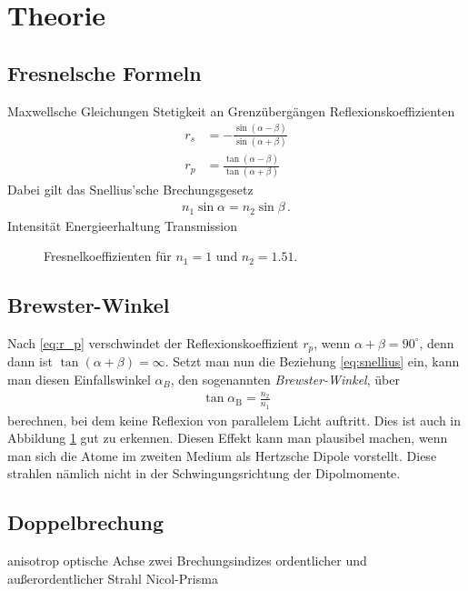\documentclass[12pt,a4paper,titlepage,headinclude,bibtotoc]{scrartcl}
\begin{document}
\section{Theorie}
\label{sec:theorie}
\subsection{Fresnelsche Formeln}
Maxwellsche Gleichungen
Stetigkeit an Grenzübergängen
Reflexionskoeffizienten
\begin{align}
	r_s&=-\frac{\sin(\alpha-\beta)}{\sin(\alpha+\beta)}
	\label{eq:r_s}\\
	r_p&=\frac{\tan(\alpha-\beta)}{\tan(\alpha+\beta)}
	\label{eq:r_p}
\end{align}
Dabei gilt das Snellius'sche Brechungsgesetz
\begin{align}
	n_1\sin\alpha=n_2\sin\beta\,.
	\label{eq:snellius}
\end{align}
Intensität
Energieerhaltung
Transmission

\begin{figure}[!h]
	\centering
	
	\caption{Fresnelkoeffizienten für $n_1=1$ und $n_2=1.51$.}
	\label{fig:fresnelkoeff}
\end{figure}

\subsection{Brewster-Winkel}
Nach \eqref{eq:r_p} verschwindet der Reflexionskoeffizient $r_p$, wenn $\alpha+\beta=90^\circ$, denn dann ist $\tan(\alpha+\beta)=\infty$.
Setzt man nun die Beziehung \eqref{eq:snellius} ein, kann man diesen Einfallswinkel $\alpha_B$, den sogenannten \emph{Brewster-Winkel}, über
\begin{align}
	\tan\alpha_\text{B}=\frac{n_2}{n_1}
	\label{eq:brewster}
\end{align}
berechnen, bei dem keine Reflexion von parallelem Licht auftritt.
Dies ist auch in Abbildung \ref{fig:fresnelkoeff} gut zu erkennen.
Diesen Effekt kann man plausibel machen, wenn man sich die Atome im zweiten Medium als Hertzsche Dipole vorstellt.
Diese strahlen nämlich nicht in der Schwingungsrichtung der Dipolmomente.

\subsection{Doppelbrechung}
anisotrop
optische Achse
zwei Brechungsindizes
ordentlicher und außerordentlicher Strahl
Nicol-Prisma
\end{document}

